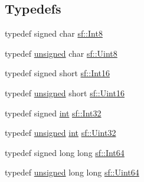 \subsection*{Typedefs}
\begin{DoxyCompactItemize}
\item 
typedef signed char \hyperlink{namespacesf_a69b109973eac74e22b97e5339bdb68dd}{sf\-::\-Int8}
\item 
typedef \hyperlink{curses_8priv_8h_aca40206900cfc164654362fa8d4ad1e6}{unsigned} char \hyperlink{namespacesf_a4ef3d630785c4f296f9b4f274c33d78e}{sf\-::\-Uint8}
\item 
typedef signed short \hyperlink{namespacesf_a3c8e10435e2a310a7741755e66b5c94e}{sf\-::\-Int16}
\item 
typedef \hyperlink{curses_8priv_8h_aca40206900cfc164654362fa8d4ad1e6}{unsigned} short \hyperlink{namespacesf_a2fcaf787248b0b83dfb6b145ca348246}{sf\-::\-Uint16}
\item 
typedef signed \hyperlink{term__entry_8h_ad65b480f8c8270356b45a9890f6499ae}{int} \hyperlink{namespacesf_ac2dfd4952377a26dee4750e2e4a30a15}{sf\-::\-Int32}
\item 
typedef \hyperlink{curses_8priv_8h_aca40206900cfc164654362fa8d4ad1e6}{unsigned} \hyperlink{term__entry_8h_ad65b480f8c8270356b45a9890f6499ae}{int} \hyperlink{namespacesf_aa746fb1ddef4410bddf198ebb27e727c}{sf\-::\-Uint32}
\item 
typedef signed long long \hyperlink{namespacesf_a2840579fed3494d9f330baf7a5a19903}{sf\-::\-Int64}
\item 
typedef \hyperlink{curses_8priv_8h_aca40206900cfc164654362fa8d4ad1e6}{unsigned} long long \hyperlink{namespacesf_add9ac83466d96b9f50a009b9f4064266}{sf\-::\-Uint64}
\end{DoxyCompactItemize}


